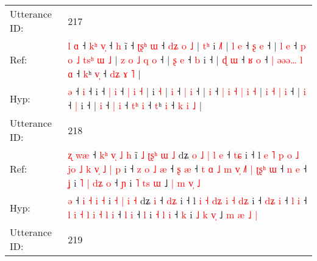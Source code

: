 \documentclass[10pt]{article}
\DeclareRobustCommand{\hl}[1]{{\textcolor{red}{#1}}}
\begin{document}
\begin{longtable}{ll}
 \\
\midrule
Utterance ID: & 217 \\
Ref: & \hl{l}\hl{ }\hl{ɑ} ˧\hl{ }\hl{k}\hl{ʰ} \hl{v}\hl{̩} ˧\hl{ }\hl{h} i\hl{̃} ˧ \hl{ʈ}\hl{ʂ}\hl{ʰ} \hl{ɯ} ˧ \hl{d}\hl{ʑ} \hl{o} \hl{˩} |\hl{ }\hl{t}\hl{ʰ} i \hl{˩}\hl{˥} |\hl{ }\hl{l} \hl{e} ˧ \hl{ʂ} \hl{e} ˧ |\hl{ }\hl{l} \hl{e} ˧ \hl{p} \hl{o} \hl{˩} \hl{t}\hl{s}\hl{ʰ} \hl{ɯ} \hl{˩} |\hl{ }\hl{z} \hl{o} \hl{˩} \hl{q} \hl{o} ˧ |\hl{ }\hl{ʂ} \hl{e} ˧ \hl{b} i ˧ |\hl{ }\hl{ɖ} \hl{ɯ} ˧ \hl{ʁ} \hl{o} ˧\hl{ }\hl{|} \hl{ə}\hl{ə}\hl{ə}\hl{…}\hl{ }\hl{l} \hl{ɑ} ˧ \hl{k}ʰ \hl{v}\hl{̩} ˧ \hl{d}\hl{ʑ} \hl{ɤ} \hl{˥} |
 \\
Hyp: & \hl{}\hl{}\hl{ə} ˧\hl{}\hl{}\hl{} \hl{}\hl{i} ˧\hl{}\hl{} i\hl{} ˧ \hl{}\hl{}\hl{|} \hl{i} ˧ \hl{}\hl{|} \hl{i} \hl{˧} |\hl{}\hl{}\hl{} i \hl{}\hl{˧} |\hl{}\hl{} \hl{i} ˧ \hl{|} \hl{i} ˧ |\hl{}\hl{} \hl{i} ˧ \hl{|} \hl{i} \hl{˧} \hl{}\hl{}\hl{|} \hl{i} \hl{˧} |\hl{}\hl{} \hl{i} \hl{˧} \hl{|} \hl{i} ˧ |\hl{}\hl{} \hl{i} ˧ \hl{|} i ˧ |\hl{}\hl{} \hl{i} ˧ \hl{|} \hl{i} ˧\hl{}\hl{} \hl{}\hl{}\hl{}\hl{}\hl{t}\hl{ʰ} \hl{i} ˧ \hl{t}ʰ \hl{}\hl{i} ˧ \hl{}\hl{k} \hl{i} \hl{˩} |
 \\
\midrule
Utterance ID: & 218 \\
Ref: & \hl{ʐ}\hl{ }\hl{w}\hl{æ} ˧ \hl{k}\hl{ʰ} \hl{v}\hl{̩} \hl{˩} \hl{h} i\hl{̃} \hl{˩} \hl{ʈ}\hl{ʂ}\hl{ʰ} \hl{ɯ} \hl{˩} dʑ\hl{ }\hl{o}\hl{ }\hl{˩}\hl{ }\hl{|}\hl{ }\hl{l} \hl{e} ˧ \hl{t}\hl{ɕ} i ˧ l\hl{ }\hl{e}\hl{ }\hl{˥}\hl{ }\hl{p}\hl{ }\hl{o} \hl{˩} \hl{j}\hl{o} \hl{˩}\hl{ }\hl{k} \hl{v}\hl{̩} \hl{˩} \hl{|}\hl{ }\hl{p} i ˧\hl{ }\hl{z} \hl{o}\hl{ }\hl{˩} \hl{æ} ˧ \hl{ʂ} \hl{æ} ˧\hl{ }\hl{t} \hl{ɑ} \hl{˩} \hl{m} \hl{v}\hl{̩} \hl{˩}\hl{˥} \hl{|} \hl{ʈ}\hl{ʂ}\hl{ʰ} \hl{ɯ} ˧ \hl{n} \hl{e} ˧ \hl{ʝ} i\hl{ }\hl{˥} \hl{|} \hl{d}\hl{ʑ} \hl{o} ˧ \hl{ɲ} i \hl{˥} \hl{t}\hl{s}\hl{ }\hl{ɯ} ˩ \hl{|} \hl{m} \hl{v}\hl{̩} \hl{˩}
 \\
Hyp: & \hl{}\hl{}\hl{}\hl{ə} ˧ \hl{}\hl{i} \hl{}\hl{˧} \hl{i} \hl{˧} i\hl{} \hl{˧} \hl{}\hl{}\hl{|} \hl{i} \hl{˧} dʑ\hl{}\hl{}\hl{}\hl{}\hl{}\hl{}\hl{}\hl{} \hl{i} ˧ \hl{d}\hl{ʑ} i ˧ l\hl{}\hl{}\hl{}\hl{}\hl{}\hl{}\hl{}\hl{} \hl{i} \hl{}\hl{˧} \hl{}\hl{d}\hl{ʑ} \hl{}\hl{i} \hl{˧} \hl{}\hl{d}\hl{ʑ} i ˧\hl{}\hl{} \hl{}\hl{d}\hl{ʑ} \hl{i} ˧ \hl{l} \hl{i} ˧\hl{}\hl{} \hl{l} \hl{i} \hl{˧} \hl{}\hl{l} \hl{}\hl{i} \hl{˧} \hl{}\hl{}\hl{l} \hl{i} ˧ \hl{l} \hl{i} ˧ \hl{l} i\hl{}\hl{} \hl{˧} \hl{}\hl{l} \hl{i} ˧ \hl{k} i \hl{˩} \hl{k}\hl{ }\hl{v}\hl{̩} ˩ \hl{m} \hl{æ} \hl{}\hl{˩} \hl{|}
 \\
\midrule
Utterance ID: & 219 \\

\end{longtable}
\end{document}
